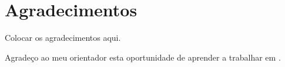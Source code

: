 


% 
% 
% 

\begingroup
\let\clearpage\relax
\let\cleardoublepage\relax
\let\cleardoublepage\relax
\chapter*{Agradecimentos}
Colocar os  agradecimentos aqui.

Agradeço ao meu orientador esta oportunidade de aprender a trabalhar em \LaTeXe.



\endgroup



